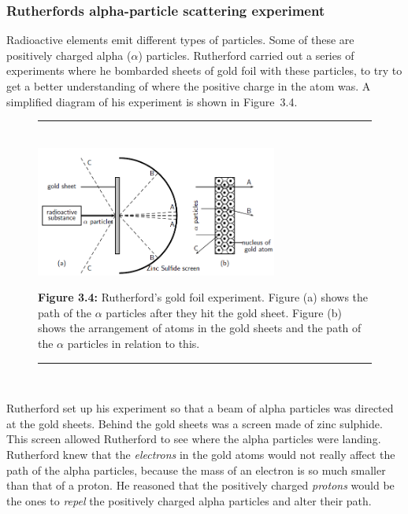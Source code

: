             \subsubsection{ Rutherfords alpha-particle scattering experiment}
            \nopagebreak
            \label{m38756*id254668}Radioactive elements emit different types of particles. Some of these are positively charged alpha ($\alpha $) particles.
Rutherford carried out a series of experiments where he bombarded sheets of gold foil with these particles, to try to get a better understanding of where the positive charge in the atom was. A simplified diagram of his experiment is shown in Figure~3.4.\par 
    \setcounter{subfigure}{0}
	\begin{figure}[H] %
    \begin{center}
    \rule[.1in]{\figurerulewidth}{.005in} \\
        \label{m38756*uid4!!!underscore!!!media}\label{m38756*uid4!!!underscore!!!printimage}\includegraphics[width=300px]{col11305.imgs/m38756_CG10C3_002.png} %
      \vspace{2pt}
    \vspace{\rubberspace}\par \begin{cnxcaption}
	  \small \textbf{Figure 3.4: }Rutherford's gold foil experiment. Figure (a) shows the path of the $\alpha $ particles after they hit the gold sheet. Figure (b) shows the arrangement of atoms in the gold sheets and the path of the $\alpha $ particles in relation to this.
	\end{cnxcaption}
    \vspace{.1in}
    \rule[.1in]{\figurerulewidth}{.005in} \\
    \end{center}
 \end{figure}       
        \label{m38756*id254715}Rutherford set up his experiment so that a beam of alpha particles was directed at the gold sheets. Behind the gold sheets was a screen made of zinc sulphide. This screen allowed Rutherford to see where the alpha particles were landing. Rutherford knew that the \textsl{electrons} in the gold atoms would not really affect the path of the alpha particles, because the mass of an electron is so much smaller than that of a proton. He reasoned that the positively charged \textsl{protons} would be the ones to \textsl{repel} the positively charged alpha particles and alter their path.\par 
